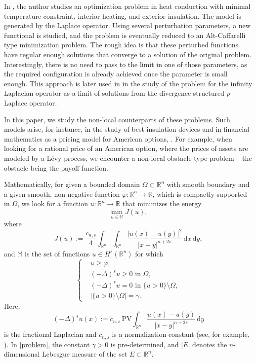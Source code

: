 \documentclass[11pt, reqno]{amsart}
\numberwithin{equation}{section}
\numberwithin{theorem}{section}
\numberwithin{lemma}{section}
\numberwithin{corollary}{section}
\numberwithin{remark}{section}
\numberwithin{proposition}{section}
\numberwithin{definition}{section}
\newcommand{\R}{\mathbb{R}}
\begin{document}
\smallskip

In \cite{Y16}, the author studies an optimization problem in heat conduction with minimal temperature constraint, interior heating, and exterior insulation. The model is generated by the Laplace operator. Using several perturbation parameters, a new functional is studied, and the problem is eventually reduced to an Alt-Caffarelli type minimization problem. The rough idea is that these perturbed functions have regular enough solutions that converge to a solution of the original problem. Interestingly, there is no need to pass to the limit in one of those parameters, as the required configuration is already achieved once the parameter is small enough. This approach is later used in \cite{TU17} in the study of the problem for the infinity Laplacian operator as a limit of solutions from the divergence structured $p$-Laplace operator. 

\smallskip

In this paper, we study the non-local counterparts of these problems. Such models arise, for instance, in the study of best insulation devices and in financial mathematics as a pricing model for American options, \cite{BM24, CT04, M24}. For example, when looking for a rational price of an American option, where the prices of assets are modeled by a L\'evy process, we encounter a non-local obstacle-type problem -- the obstacle being the payoff function. 

\smallskip

Mathematically, for given a bounded domain $\Omega\subset\R^n$ with smooth boundary and a given smooth, non-negative function $\varphi:\mathbb{R}^n\rightarrow\mathbb{R}$,  which is compactly supported in $\Omega$, we look for a function $u:\R^n\rightarrow\R$ that minimizes the energy
\begin{equation}\label{P}\tag{P}
\min_{u\in\mathbb{M}}J(u),
\end{equation}
where
\begin{equation}\label{Jdef}
    J(u):=\frac{c_{n,s}}{4}\int_{\R^n}\int_{\R^n}\frac{\left|u(x)-u(y)\right|^2}{|x-y|^{n+2s}}\,\mathrm{d}x\,\mathrm{d}y,
\end{equation}
and $\mathbb{M}$ is the set of functions $u\in H^s(\R^n)$ for which 
\begin{equation}\label{problem}
\begin{cases}
&u\ge\varphi, \\
&(-\Delta)^su \ge 0 \text{ in } \Omega, \\
&(-\Delta)^su=0 \text{ in } \{u>0\}\setminus\Omega, \\
&\left| \{u>0\}\setminus\Omega\right|=\gamma.
\end{cases}
\end{equation}
Here, 
$$
(-\Delta)^su(x):=c_{n,s}\,\textrm{PV}\int_{\R^n}\frac{u(x)-u(y)}{|x-y|^{n+2s}}\,\mathrm{d}y
$$
is the fractional Laplacian and $c_{n,s}$ is a normalization constant (see, for example, \cite{PST25, S24, T24}).  In \eqref{problem}, the constant $\gamma>0$ is pre-determined, and $|E|$ denotes the $n$-dimensional Lebesgue measure of the set $E\subset\R^n$. 
\end{document}
